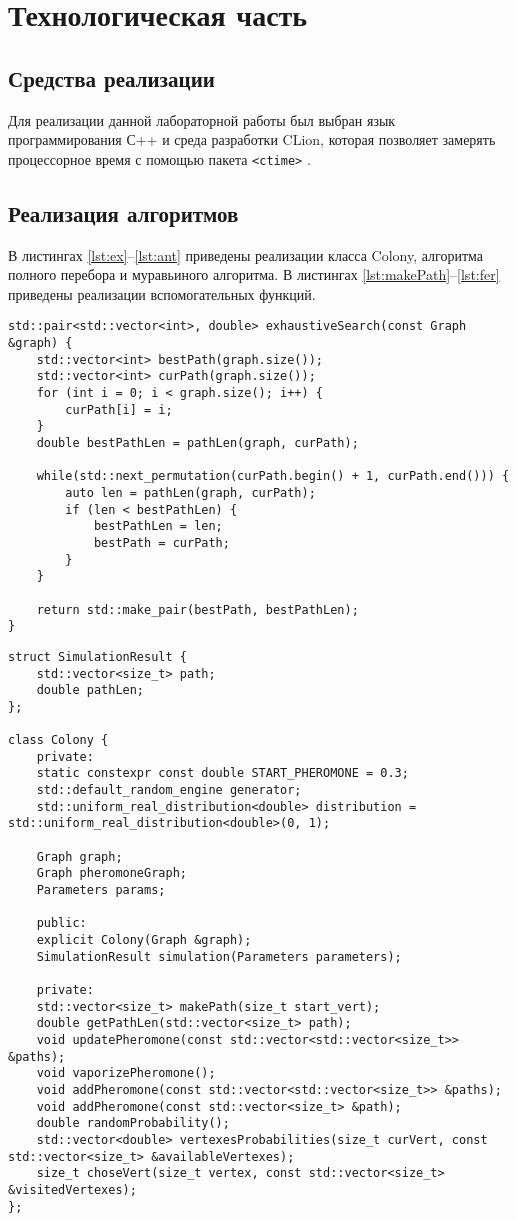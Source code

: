 \chapter{Технологическая часть}

\section{Средства реализации}

Для реализации данной лабораторной работы был выбран язык программирования С++ \cite{c} и среда разработки CLion, которая позволяет замерять процессорное время с помощью пакета \texttt{<ctime>} \cite{ctime}.

\section{Реализация алгоритмов}

В листингах \ref{lst:ex}--\ref{lst:ant} приведены реализации класса Colony, алгоритма полного перебора и муравьиного алгоритма.
В листингах \ref{lst:makePath}--\ref{lst:fer} приведены реализации вспомогательных функций.

\begin{lstlisting}[label=lst:ex,caption=Алгоритм полного перебора]
std::pair<std::vector<int>, double> exhaustiveSearch(const Graph &graph) {
	std::vector<int> bestPath(graph.size());
	std::vector<int> curPath(graph.size());
	for (int i = 0; i < graph.size(); i++) {
		curPath[i] = i;
	}
	double bestPathLen = pathLen(graph, curPath);
	
	while(std::next_permutation(curPath.begin() + 1, curPath.end())) {
		auto len = pathLen(graph, curPath);
		if (len < bestPathLen) {
			bestPathLen = len;
			bestPath = curPath;
		}
	}
	
	return std::make_pair(bestPath, bestPathLen);
}
\end{lstlisting}

\clearpage
\begin{lstlisting}[label=lst:col,caption=Класс Colony]
struct SimulationResult {
	std::vector<size_t> path;
	double pathLen;
};

class Colony {
	private:
	static constexpr const double START_PHEROMONE = 0.3;
	std::default_random_engine generator;
	std::uniform_real_distribution<double> distribution = std::uniform_real_distribution<double>(0, 1);
	
	Graph graph;
	Graph pheromoneGraph;
	Parameters params;
	
	public:
	explicit Colony(Graph &graph);
	SimulationResult simulation(Parameters parameters);
	
	private:
	std::vector<size_t> makePath(size_t start_vert);
	double getPathLen(std::vector<size_t> path);
	void updatePheromone(const std::vector<std::vector<size_t>> &paths);
	void vaporizePheromone();
	void addPheromone(const std::vector<std::vector<size_t>> &paths);
	void addPheromone(const std::vector<size_t> &path);
	double randomProbability();
	std::vector<double> vertexesProbabilities(size_t curVert, const std::vector<size_t> &availableVertexes);
	size_t choseVert(size_t vertex, const std::vector<size_t> &visitedVertexes);
};
\end{lstlisting}

